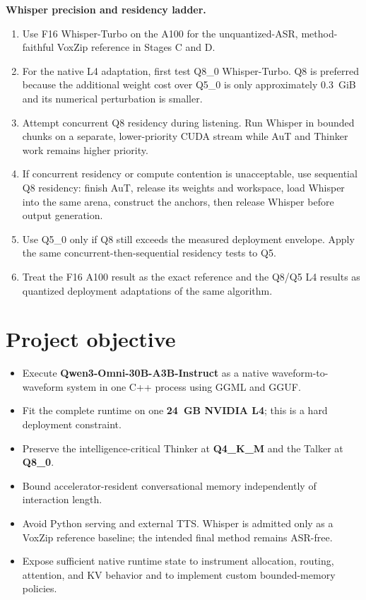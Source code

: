 \documentclass[10pt,letterpaper]{article}
\begin{document}
\noindent\textbf{Whisper precision and residency ladder.}
\begin{enumerate}
    \item Use F16 Whisper-Turbo on the A100 for the unquantized-ASR, method-faithful VoxZip reference in Stages C and D.
    \item For the native L4 adaptation, first test Q8\_0 Whisper-Turbo. Q8 is preferred because the additional weight cost over Q5\_0 is only approximately 0.3~GiB and its numerical perturbation is smaller.
    \item Attempt concurrent Q8 residency during listening. Run Whisper in bounded chunks on a separate, lower-priority CUDA stream while AuT and Thinker work remains higher priority.
    \item If concurrent residency or compute contention is unacceptable, use sequential Q8 residency: finish AuT, release its weights and workspace, load Whisper into the same arena, construct the anchors, then release Whisper before output generation.
    \item Use Q5\_0 only if Q8 still exceeds the measured deployment envelope. Apply the same concurrent-then-sequential residency tests to Q5.
    \item Treat the F16 A100 result as the exact reference and the Q8/Q5 L4 results as quantized deployment adaptations of the same algorithm.
\end{enumerate}

\section*{Project objective}
\begin{itemize}
    \item Execute \textbf{Qwen3-Omni-30B-A3B-Instruct} as a native waveform-to-waveform system in one C++ process using GGML and GGUF.
    \item Fit the complete runtime on one \textbf{24~GB NVIDIA L4}; this is a hard deployment constraint.
    \item Preserve the intelligence-critical Thinker at \textbf{Q4\_K\_M} and the Talker at \textbf{Q8\_0}.
    \item Bound accelerator-resident conversational memory independently of interaction length.
    \item Avoid Python serving and external TTS. Whisper is admitted only as a VoxZip reference baseline; the intended final method remains ASR-free.
    \item Expose sufficient native runtime state to instrument allocation, routing, attention, and KV behavior and to implement custom bounded-memory policies.
\end{itemize}
\end{document}
